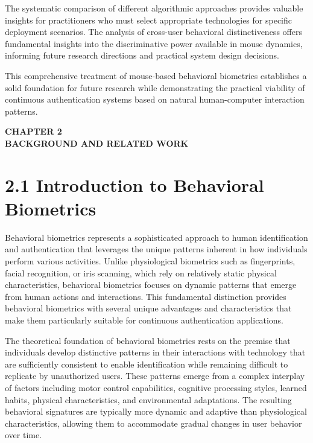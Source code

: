 \documentclass[
  12pt,
  a4paper,
]{report}
\begin{document}
The systematic comparison of different algorithmic approaches provides
valuable insights for practitioners who must select appropriate
technologies for specific deployment scenarios. The analysis of
cross-user behavioral distinctiveness offers fundamental insights into
the discriminative power available in mouse dynamics, informing future
research directions and practical system design decisions.

This comprehensive treatment of mouse-based behavioral biometrics
establishes a solid foundation for future research while demonstrating
the practical viability of continuous authentication systems based on
natural human-computer interaction patterns.

\newpage
\thispagestyle{plain}

\begin{center}
\vspace\*{2cm}
\textbf{\Large CHAPTER 2}\\[0.5cm]
\textbf{\Large BACKGROUND AND RELATED WORK}
\end{center}

\newpage

\section{2.1 Introduction to Behavioral
Biometrics}\label{introduction-to-behavioral-biometrics}

Behavioral biometrics represents a sophisticated approach to human
identification and authentication that leverages the unique patterns
inherent in how individuals perform various activities. Unlike
physiological biometrics such as fingerprints, facial recognition, or
iris scanning, which rely on relatively static physical characteristics,
behavioral biometrics focuses on dynamic patterns that emerge from human
actions and interactions. This fundamental distinction provides
behavioral biometrics with several unique advantages and characteristics
that make them particularly suitable for continuous authentication
applications.

The theoretical foundation of behavioral biometrics rests on the premise
that individuals develop distinctive patterns in their interactions with
technology that are sufficiently consistent to enable identification
while remaining difficult to replicate by unauthorized users. These
patterns emerge from a complex interplay of factors including motor
control capabilities, cognitive processing styles, learned habits,
physical characteristics, and environmental adaptations. The resulting
behavioral signatures are typically more dynamic and adaptive than
physiological characteristics, allowing them to accommodate gradual
changes in user behavior over time.
\end{document}
